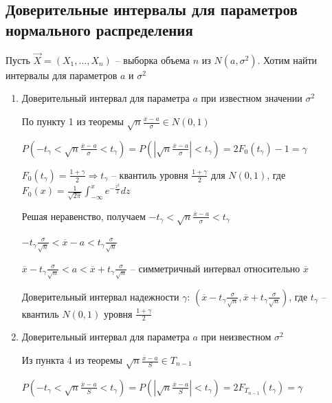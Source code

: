 \subsection{Доверительные интервалы для параметров нормального распределения}

Пусть $\vec X = (X_1, \dots, X_n)$ -- выборка объема $n$ из $N(a, \sigma^2)$. 
Хотим найти интервалы для параметров $a$ и $\sigma^2$

\begin{enumerate}[label*=\Roman*.]
    \hypertarget{confidence_interval_for_a_known_sigma}{}

    \item Доверительный интервал для параметра $a$ при известном значении $\sigma^2$

    По пункту 1 из теоремы $\sqrt{n} \frac{\overline{x} - a}{\sigma} \in N(0, 1)$ 

    $P\left(-t_\gamma < \sqrt{n} \frac{\overline{x} - a}{\sigma} < t_\gamma\right) = 
    P\left(\left|\sqrt{n} \frac{\overline{x} - a}{\sigma}\right| < t_\gamma\right) = 2F_0 (t_\gamma) - 1 = \gamma$

    $F_0(t_\gamma) = \frac{1 + \gamma}{2} \Longrightarrow t_\gamma$ -- квантиль уровня 
    $\frac{1 + \gamma}{2}$ для $N(0, 1)$, где
    $F_0(x) = \frac{1}{\sqrt{2\pi}} \int_{-\infty}^{x} e^{-\frac{z^2}{2}} dz$

    Решая неравенство, получаем $-t_\gamma < \sqrt{n} \frac{\overline{x} - a}{\sigma} < t_\gamma$

    $-t_\gamma \frac{\sigma}{\sqrt{n}} < \overline{x} - a < t_\gamma \frac{\sigma}{\sqrt{n}}$

    $\overline{x} - t_\gamma \frac{\sigma}{\sqrt{n}} < a < \overline{x} + t_\gamma \frac{\sigma}{\sqrt{n}}$ -- 
    симметричный интервал относительно $\overline{x}$

    Доверительный интервал надежности $\gamma$: $\left(\overline{x} - t_\gamma \frac{\sigma}{\sqrt{n}}, 
    \overline{x} + t_\gamma \frac{\sigma}{\sqrt{n}}\right)$, 
    где $t_\gamma$ -- квантиль $N(0, 1)$ уровня $\frac{1 + \gamma}{2}$

    \hypertarget{confidence_interval_for_a_unknown_sigma}{}

    \item Доверительный интервал для параметра $a$ при неизвестном $\sigma^2$

    Из пункта 4 из теоремы $\sqrt{n} \frac{\overline{x} - a}{S} \in T_{n - 1}$

    $P\left(-t_\gamma < \sqrt{n} \frac{\overline{x} - a}{S} < t_\gamma\right) = P\left(\left|\sqrt{n} \frac{\overline{x} - a}{S}\right| < t_\gamma\right) = 2F_{T_{n - 1}}(t_\gamma) = \gamma$


\end{enumerate}
